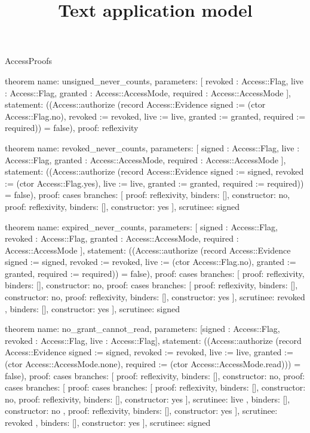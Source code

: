 \begin{lexlean}{AccessProofs}
\title{Text application model}
\begin{semanticmodule}
theorem{
  name: unsigned_never_counts,
  parameters: [
    revoked : Access::Flag,
    live : Access::Flag,
    granted : Access::AccessMode,
    required : Access::AccessMode
  ],
  statement: ((Access::authorize (record Access::Evidence {signed := (ctor Access::Flag.no), revoked := revoked, live := live, granted := granted, required := required})) = false),
  proof: reflexivity{}
}

theorem{
  name: revoked_never_counts,
  parameters: [
    signed : Access::Flag,
    live : Access::Flag,
    granted : Access::AccessMode,
    required : Access::AccessMode
  ],
  statement: ((Access::authorize (record Access::Evidence {signed := signed, revoked := (ctor Access::Flag.yes), live := live, granted := granted, required := required})) = false),
  proof: cases{
    branches: [
      {proof: reflexivity{}, binders: [], constructor: no},
      {proof: reflexivity{}, binders: [], constructor: yes}
    ],
    scrutinee: signed
  }
}

theorem{
  name: expired_never_counts,
  parameters: [
    signed : Access::Flag,
    revoked : Access::Flag,
    granted : Access::AccessMode,
    required : Access::AccessMode
  ],
  statement: ((Access::authorize (record Access::Evidence {signed := signed, revoked := revoked, live := (ctor Access::Flag.no), granted := granted, required := required})) = false),
  proof: cases{
    branches: [
      {proof: reflexivity{}, binders: [], constructor: no},
      {
        proof: cases{
          branches: [
            {proof: reflexivity{}, binders: [], constructor: no},
            {proof: reflexivity{}, binders: [], constructor: yes}
          ],
          scrutinee: revoked
        },
        binders: [],
        constructor: yes
      }
    ],
    scrutinee: signed
  }
}

theorem{
  name: no_grant_cannot_read,
  parameters: [signed : Access::Flag, revoked : Access::Flag, live : Access::Flag],
  statement: ((Access::authorize (record Access::Evidence {signed := signed, revoked := revoked, live := live, granted := (ctor Access::AccessMode.none), required := (ctor Access::AccessMode.read)})) = false),
  proof: cases{
    branches: [
      {proof: reflexivity{}, binders: [], constructor: no},
      {
        proof: cases{
          branches: [
            {
              proof: cases{
                branches: [
                  {proof: reflexivity{}, binders: [], constructor: no},
                  {proof: reflexivity{}, binders: [], constructor: yes}
                ],
                scrutinee: live
              },
              binders: [],
              constructor: no
            },
            {proof: reflexivity{}, binders: [], constructor: yes}
          ],
          scrutinee: revoked
        },
        binders: [],
        constructor: yes
      }
    ],
    scrutinee: signed
  }
}


\end{semanticmodule}
\end{lexlean}
